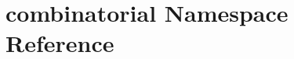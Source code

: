 \hypertarget{namespacecombinatorial}{\section{combinatorial Namespace Reference}
\label{namespacecombinatorial}
}
